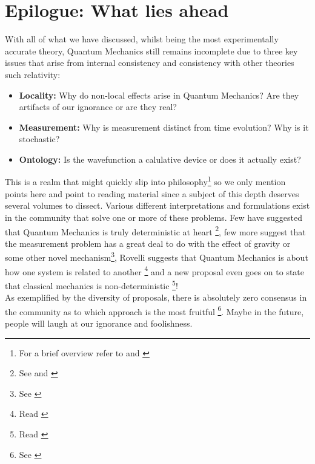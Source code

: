\chapter{Epilogue: What lies ahead}
With all of what we have  discussed, whilst being the most experimentally accurate theory, Quantum Mechanics still remains incomplete due to three key issues that arise from internal consistency and consistency with other theories such relativity: 
\begin{itemize}
\item \textbf{Locality:} Why do non-local effects arise in Quantum Mechanics? Are they artifacts of our ignorance or are they real?
\item \textbf{Measurement:} Why is measurement distinct from time evolution? Why is it stochastic?
\item \textbf{Ontology:} Is the wavefunction a calulative device or does it actually exist?
\end{itemize}
This is a realm that might quickly slip into philosophy\footnote{For a brief overview refer to \cite{p27} and \cite{p28}} so we only mention points here and point to reading material since a subject of this depth deserves several volumes to dissect. Various different interpretations and formulations exist in the community that solve one or more of these problems. Few have suggested that Quantum Mechanics is truly deterministic at heart \footnote{See \cite{p26} and \cite{p24}}, few more suggest that the measurement problem has a great deal to do with the effect of gravity or some other novel mechanism\footnote{See \cite{p2}}, Rovelli suggests that Quantum Mechanics is about how one system is related to another \footnote{Read \cite{p25}} and a new proposal even goes on to state that classical mechanics is non-deterministic \footnote{Read \cite{p29}}! 
\\
As exemplified by the diversity of proposals, there is absolutely zero consensus in the community as to which approach is the most fruitful \footnote{See \cite{p31}}. Maybe in the future, people will laugh at our ignorance and foolishness.
